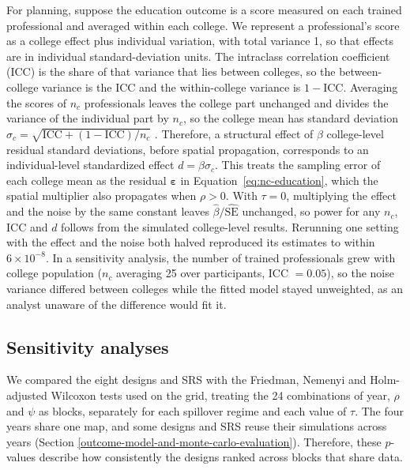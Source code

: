 \documentclass[11pt]{article}
\begin{document}
For planning, suppose the education outcome is a score measured on each trained professional and averaged within each college. We represent a professional's score as a college effect plus individual variation, with total variance 1, so that effects are in individual standard-deviation units. The intraclass correlation coefficient (ICC) is the share of that variance that lies between colleges, so the between-college variance is the ICC and the within-college variance is $1 - \text{ICC}$. Averaging the scores of $n_c$ professionals leaves the college part unchanged and divides the variance of the individual part by $n_c$, so the college mean has standard deviation $\sigma_c = \sqrt{\text{ICC} + (1 - \text{ICC})/n_c}$ \citep{donner_design_2000, hayes_cluster_2017}. Therefore, a structural effect of $\beta$ college-level residual standard deviations, before spatial propagation, corresponds to an individual-level standardized effect $d = \beta\sigma_c$. This treats the sampling error of each college mean as the residual $\boldsymbol{\varepsilon}$ in Equation~\ref{eq:nc-education}, which the spatial multiplier also propagates when $\rho > 0$. With $\tau = 0$, multiplying the effect and the noise by the same constant leaves $\hat\beta/\widehat{\mathrm{SE}}$ unchanged, so power for any $n_c$, ICC and $d$ follows from the simulated college-level results. Rerunning one setting with the effect and the noise both halved reproduced its estimates to within $6\times10^{-8}$. In a sensitivity analysis, the number of trained professionals grew with college population ($n_c$ averaging 25 over participants, ICC $= 0.05$), so the noise variance differed between colleges while the fitted model stayed unweighted, as an analyst unaware of the difference would fit it.


\subsection{Sensitivity analyses}\label{further-sensitivity-analyses}


\iffullsi
We compared the eight designs and SRS with the Friedman, Nemenyi and Holm-adjusted Wilcoxon tests used on the grid, treating the 24 combinations of year, $\rho$ and $\psi$ as blocks, separately for each spillover regime and each value of $\tau$. The four years share one map, and some designs and SRS reuse their simulations across years (Section \ref{outcome-model-and-monte-carlo-evaluation}). Therefore, these $p$-values describe how consistently the designs ranked across blocks that share data.
\fi
\end{document}

